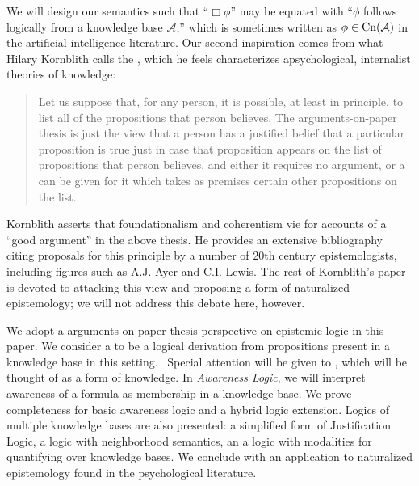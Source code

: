 \begin{quote}
  {}
\end{quote}

We will design our semantics such that ``$\Box \phi$'' may be equated with
``$\phi$ follows logically from a knowledge base $\mathcal{A}$,'' which is
sometimes written as $\phi \in \operatorname{Cn} ( \mathcal{A})$ in the artificial
intelligence literature.  Our second inspiration comes from what Hilary
Kornblith calls the 
{\cite{kornblith_beyond_1980}}, which he feels characterizes apsychological,
internalist theories of knowledge:

\begin{quote}
  Let us suppose that, for any person, it is possible, at least in principle,
  to list all of the propositions that person believes.  The
  arguments-on-paper thesis is just the view that a person has a justified
  belief that a particular proposition is true just in case that proposition
  appears on the list of propositions that person believes, and either it
  requires no argument, or a {} can be given for it which
  takes as premises certain other propositions on the list.
\end{quote}

Kornblith asserts that foundationalism and coherentism vie for accounts of a
``good argument'' in the above thesis.  He provides an extensive bibliography
citing proposals for this principle by a number of 20th century
epistemologists, including figures such as A.J. Ayer and C.I. Lewis.  The
rest of Kornblith's paper is devoted to attacking this view and proposing a
form of naturalized epistemology; we will not address this debate here,
however.

We adopt a arguments-on-paper-thesis perspective on epistemic logic in this
paper.  We consider a  to be a logical derivation
from propositions present in a knowledge base in this setting.  \
Special attention will be given to , which will be
thought of as a form of knowledge.  In \emph{Awareness Logic}, we will interpret
awareness of a formula as membership in a knowledge base.  We prove
completeness for basic awareness logic and a hybrid logic extension.  Logics
of multiple knowledge bases are also presented: a simplified form of
Justification Logic, a logic with neighborhood semantics, an a logic with
modalities for quantifying over knowledge bases.  We conclude with an
application to naturalized epistemology found in the psychological
literature.
